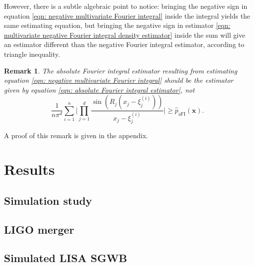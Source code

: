 \documentclass[%
 reprint,
 amsmath,amssymb,
 aps,
]{revtex4-2}
\newtheorem{remark}[theorem]{Remark}
\begin{document}
However, there is a subtle algebraic point to notice: bringing the negative sign in equation \eqref{eqn: negative multivariate Fourier integral} inside the integral yields the same estimating equation, but bringing the negative sign in estimator \eqref{eqn: multivariate negative Fourier integral density estimator} inside the sum will give an estimator different than the negative Fourier integral estimator, according to triangle inequality.
\begin{remark} \label{remark: triangle inequality in aFI}
    The absolute Fourier integral estimator resulting from estimating equation \eqref{eqn: negative multivariate Fourier integral} should be the estimator given by equation \eqref{eqn: absolute Fourier integral estimator}, not
    \begin{equation*}
        \frac{1}{n\pi^d}\sum_{i = 1}^n \bigg|\prod_{j = 1}^d \frac{\sin(R_j(x_j - \xi_j^{(i)}))}{x_j - \xi_j^{(i)}}\bigg| \ge \hat{p}_\text{aFI}(\mathbf{x}).
    \end{equation*}
\end{remark}
A proof of this remark is given in the appendix.









\section{Results}

\subsection{\label{subsec:simulation study} Simulation study}





\subsection{\label{subsec:LIGO} LIGO merger}


\subsection{\label{subsec:LISA} Simulated LISA SGWB}
\end{document}
